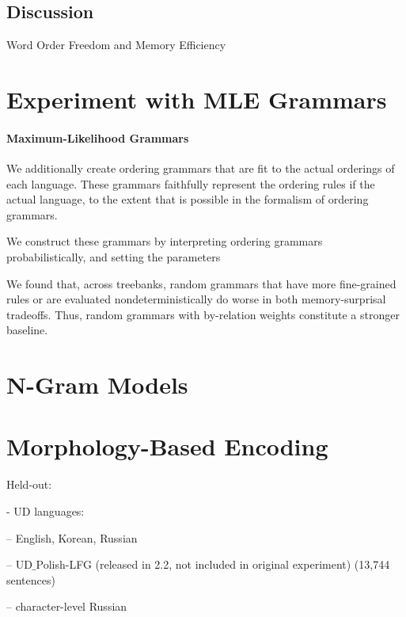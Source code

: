 \documentclass[11pt,letterpaper]{article}
\begin{document}
\subsection{Discussion}


Word Order Freedom and Memory Efficiency






\appendix

\section{Experiment with MLE Grammars}


\paragraph{Maximum-Likelihood Grammars}
We additionally create ordering grammars that are fit to the actual orderings of each language.
These grammars faithfully represent the ordering rules if the actual language, to the extent that is possible in the formalism of ordering grammars.

We construct these grammars by interpreting ordering grammars probabilistically, and setting the parameters 


We found that, across treebanks, random grammars that have more fine-grained rules or are evaluated nondeterministically do worse in both memory-surprisal tradeoffs.
Thus, random grammars with by-relation weights constitute a stronger baseline.



\section{N-Gram Models}



\section{Morphology-Based Encoding}



Held-out:

- UD languages:

-- English, Korean, Russian

-- UD$\_$Polish-LFG (released in 2.2, not included in original experiment) (13,744 sentences)

-- character-level Russian
\end{document}
